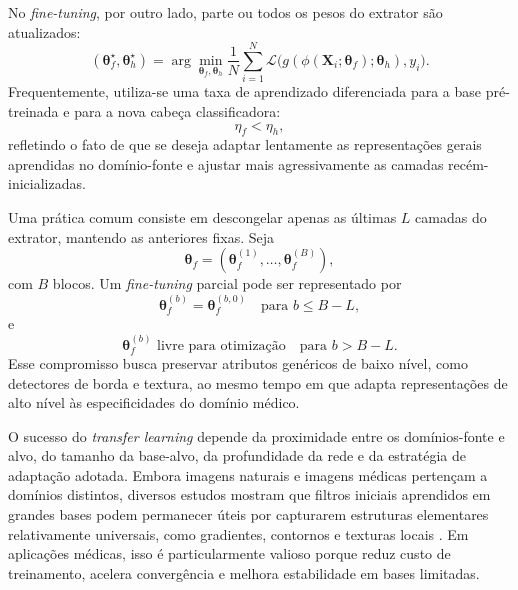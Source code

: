 \documentclass[tcc,capa]{texufpel}
\begin{document}
No \textit{fine-tuning}, por outro lado, parte ou todos os pesos do extrator são atualizados:
\begin{equation}
(\boldsymbol{\theta}_f^{\star},\boldsymbol{\theta}_h^{\star})
=
\arg\min_{\boldsymbol{\theta}_f,\boldsymbol{\theta}_h}
\frac{1}{N}\sum_{i=1}^{N}
\mathcal{L}\big(g(\phi(\mathbf{X}_i;\boldsymbol{\theta}_f);\boldsymbol{\theta}_h), y_i\big).
\end{equation}
Frequentemente, utiliza-se uma taxa de aprendizado diferenciada para a base pré-treinada e para a nova cabeça classificadora:
\begin{equation}
\eta_f < \eta_h,
\end{equation}
refletindo o fato de que se deseja adaptar lentamente as representações gerais aprendidas no domínio-fonte e ajustar mais agressivamente as camadas recém-inicializadas.

Uma prática comum consiste em descongelar apenas as últimas $L$ camadas do extrator, mantendo as anteriores fixas. Seja
\begin{equation}
\boldsymbol{\theta}_f =
(\boldsymbol{\theta}_f^{(1)}, \dots, \boldsymbol{\theta}_f^{(B)}),
\end{equation}
com $B$ blocos. Um \textit{fine-tuning} parcial pode ser representado por
\begin{equation}
\boldsymbol{\theta}_f^{(b)} = \boldsymbol{\theta}_f^{(b,0)} \quad \text{para } b \leq B-L,
\end{equation}
e
\begin{equation}
\boldsymbol{\theta}_f^{(b)} \text{ livre para otimização} \quad \text{para } b > B-L.
\end{equation}
Esse compromisso busca preservar atributos genéricos de baixo nível, como detectores de borda e textura, ao mesmo tempo em que adapta representações de alto nível às especificidades do domínio médico.

O sucesso do \textit{transfer learning} depende da proximidade entre os domínios-fonte e alvo, do tamanho da base-alvo, da profundidade da rede e da estratégia de adaptação adotada. Embora imagens naturais e imagens médicas pertençam a domínios distintos, diversos estudos mostram que filtros iniciais aprendidos em grandes bases podem permanecer úteis por capturarem estruturas elementares relativamente universais, como gradientes, contornos e texturas locais \cite{Yosinski2014}. Em aplicações médicas, isso é particularmente valioso porque reduz custo de treinamento, acelera convergência e melhora estabilidade em bases limitadas.
\end{document}

